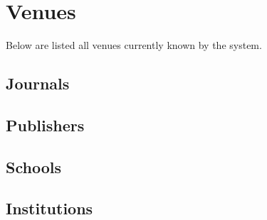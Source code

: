 \chapter{Venues}
\label{venues}

Below are listed all venues currently known by the system.

\footnotesize

\section{Journals}


\section{Publishers}


\section{Schools}


\section{Institutions}


\normalsize
